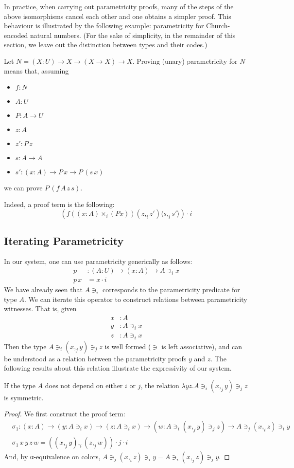 \documentclass[english]{PaperTools/latex/lipics}
\newcommand\CP[3]{(#2,_{#1} #3)}
\newcommand\CTimes[2]{(#2) ×_{#1}}
\newcommand\param[1]{\!\cdot\!#1}
\newcommand\op[1]{∋_{#1}}
\newcommand\fp[3]{⟨#2 ,_{#1} #3⟩}
\begin{document}
In practice, when carrying out parametricity proofs, many of the steps
of the above isomorphisms cancel each other and one obtains a simpler
proof. This behaviour is illustrated by the following example:
parametricity for Church-encoded natural numbers.
(For the sake of simplicity, in the remainder of this section, we leave out the
distinction between types and their codes.)
\begin{example}
Let $N = (X : U) → X → (X → X) → X$.
Proving (unary) parametricity for $N$ means that, assuming
\begin{itemize}
\item $f : N$
\item $A : U$
\item $P : A → U$
\item $z : A$
\item $z' : P\, z$
\item $s : A → A$
\item $s' : (x:A) → P\, x → P\, (s\, x)$
\end{itemize}
we can prove $P\, (f\, A\, z\, s)$.

Indeed, a proof term is the following:
%
\[
(f (\CTimes i {x:A} (P x)) \CP i z {z'} \fp i s {s'}) \param i
\]
\end{example}

\subsection{Iterating Parametricity}
In our system, one can use parametricity generically as follows:
\begin{align*}
p &: (A:U) → (x:A) → A \op i x\\
p\, x &= x\param i
\end{align*}
We have already seen that $A \op i $ corresponds to the parametricity
predicate for type $A$. We can iterate this operator to construct
relations between parametricity witnesses. That is, given
\begin{align*}
  x & :A \\
  y & : A \op i x\\
  z & : A \op i x
\end{align*}
Then the type $A \op i \CP j x y \op j z$ is well formed ($∋$ is left
associative), and can be understood as a relation
between the parametricity proofs $y$ and $z$. The following results about this relation illustrate the expressivity of our system.
\begin{theorem}
If the type $A$ does not depend on either $i$ or $j$, the relation $λy z. A \op i \CP j x y \op j z$ is symmetric.
\end{theorem}
\begin{proof}
  We first construct the proof term:
  \begin{align*}
    &\sigma_1 : (x:A) → (y : A \op i x) → (z : A \op i x) → (w : A \op i \CP j x y \op j z) → A \op j \CP i x z \op i y \\
    &\sigma_1\, x\, y\, z\, w = \CP i {\CP j x y}{\CP j z w} \param j \param i
  \end{align*}
  And, by α-equivalence on colors, $A \op j \CP i x z \op i y = A \op i \CP j x z \op j y$.
\end{proof}
\end{document}
